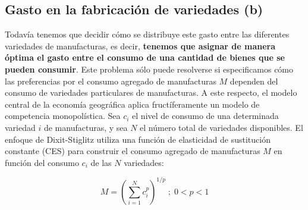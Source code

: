 \subsection{Gasto en la fabricación de variedades (b)}
Todavía tenemos que decidir cómo se distribuye este gasto entre las diferentes variedades de manufacturas, es decir, \textbf{tenemos que asignar de manera óptima el gasto entre el consumo de una cantidad de bienes que se pueden consumir}. Este problema sólo puede resolverse si especificamos cómo las preferencias por el consumo agregado de manufacturas $M$ dependen del consumo de variedades particulares de manufacturas. A este respecto, el modelo central de la economía geográfica aplica fructíferamente un modelo de competencia monopolística. Sea $c_i$ el nivel de consumo de una determinada variedad $i$ de manufacturas, y sea $N$ el número total de variedades disponibles. El enfoque de Dixit-Stiglitz utiliza una función de elasticidad de sustitución constante (CES) para construir el consumo agregado de manufacturas $M$ en función del consumo $c_i$ de las $N$ variedades:

$$M=\left(\sum_{i=1}^N c_i^p\right)^{1/p}\; ; \; 0<p<1$$

